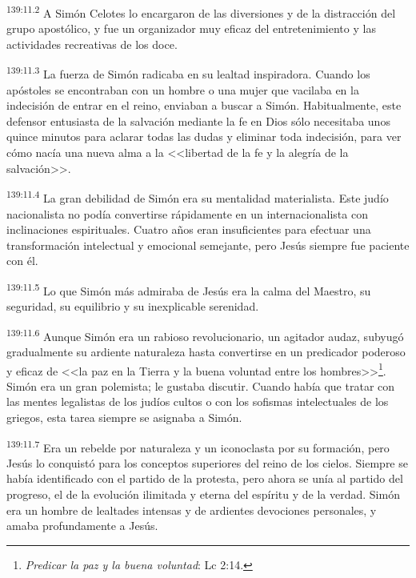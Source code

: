 \par 
\textsuperscript{139:11.2} A Simón Celotes lo encargaron de las diversiones y de la distracción del grupo apostólico, y fue un organizador muy eficaz del entretenimiento y las actividades recreativas de los doce.

\par 
\textsuperscript{139:11.3} La fuerza de Simón radicaba en su lealtad inspiradora. Cuando los apóstoles se encontraban con un hombre o una mujer que vacilaba en la indecisión de entrar en el reino, enviaban a buscar a Simón. Habitualmente, este defensor entusiasta de la salvación mediante la fe en Dios sólo necesitaba unos quince minutos para aclarar todas las dudas y eliminar toda indecisión, para ver cómo nacía una nueva alma a la <<libertad de la fe y la alegría de la salvación>>.

\par 
\textsuperscript{139:11.4} La gran debilidad de Simón era su mentalidad materialista. Este judío nacionalista no podía convertirse rápidamente en un internacionalista con inclinaciones espirituales. Cuatro años eran insuficientes para efectuar una transformación intelectual y emocional semejante, pero Jesús siempre fue paciente con él.

\par 
\textsuperscript{139:11.5} Lo que Simón más admiraba de Jesús era la calma del Maestro, su seguridad, su equilibrio y su inexplicable serenidad.

\par 
\textsuperscript{139:11.6} Aunque Simón era un rabioso revolucionario, un agitador audaz, subyugó gradualmente su ardiente naturaleza hasta convertirse en un predicador poderoso y eficaz de <<la paz en la Tierra y la buena voluntad entre los hombres>>\footnote{\textit{Predicar la paz y la buena voluntad}: Lc 2:14.}. Simón era un gran polemista; le gustaba discutir. Cuando había que tratar con las mentes legalistas de los judíos cultos o con los sofismas intelectuales de los griegos, esta tarea siempre se asignaba a Simón.

\par 
\textsuperscript{139:11.7} Era un rebelde por naturaleza y un iconoclasta por su formación, pero Jesús lo conquistó para los conceptos superiores del reino de los cielos. Siempre se había identificado con el partido de la protesta, pero ahora se unía al partido del progreso, el de la evolución ilimitada y eterna del espíritu y de la verdad. Simón era un hombre de lealtades intensas y de ardientes devociones personales, y amaba profundamente a Jesús.


